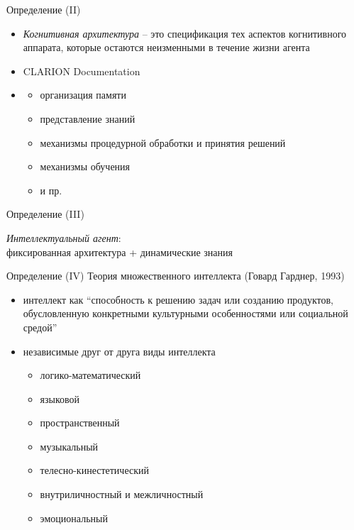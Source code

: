 \documentclass{beamer}
\begin{document}
\begin{frame}{Определение (II)}
\begin{itemize}
    \item[] \textit{Когнитивная архитектура} -- это спецификация тех аспектов когнитивного аппарата, которые остаются неизменными в течение жизни агента
    \item[] \hfill {\small CLARION Documentation}
    \bigskip
    \item[]
        \begin{itemize}
            \item организация памяти
            \item представление знаний
            \item механизмы процедурной обработки и принятия решений
            \item механизмы обучения
            \item и пр.
        \end{itemize}
\end{itemize}
\end{frame}

\begin{frame}{Определение (III)}
\begin{center}
\textit{Интеллектуальный агент}:\\фиксированная архитектура + динамические знания
\end{center}
\end{frame}

\begin{frame}{Определение (IV)}
Теория множественного интеллекта (Говард Гарднер, 1993)\\
\bigskip
\begin{itemize}
    \item интеллект как ``способность к решению задач или созданию продуктов, обусловленную конкретными культурными особенностями или социальной средой''
    \medskip
    \item независимые друг от друга виды интеллекта
        \medskip
        \begin{itemize}
           \item логико-математический
           \item языковой
           \item пространственный
           \item музыкальный
           \item телесно-кинестетический
           \item внутриличностный и межличностный
           \item эмоциональный
        \end{itemize}
\end{itemize}
\end{frame}
\end{document}
